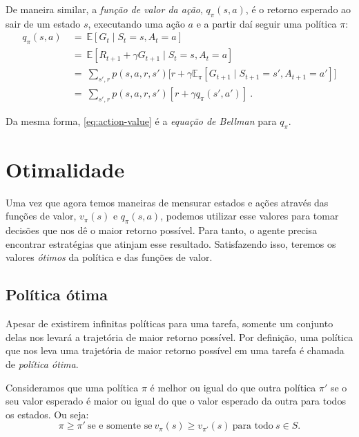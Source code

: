 \documentclass{article}
\begin{document}
            De maneira similar, a \emph{função de valor da ação}, $q_{\pi}(s, a)$, é o retorno esperado ao sair de um estado $s$, executando uma ação $a$ e a partir daí seguir uma política $\pi$:
            \begin{equation}
            \label{eq:action-value}
            \begin{split}
                q_{\pi}(s, a) & \ = \ \mathbb{E}[G_t \mid S_t = s, A_t = a] \\
                & \ = \ \mathbb{E}[R_{t+1} + \gamma G_{t+1} \mid S_t = s, A_t = a] \\
                & \ = \ \sum_{s',r} p(s, a, r, s') \Big[r + \gamma \mathbb{E}_{\pi}[ G_{t+1} \mid S_{t+1} = s', A_{t+1} = a'] \Big]\\
                & \ = \ \sum_{s',r} p(s, a, r, s') [r + \gamma q_{\pi}(s', a')]\ .
            \end{split}
            \end{equation}

            Da mesma forma, \eqref{eq:action-value} é a \emph{equação de Bellman} para $q_{\pi}$.
        
    \section{Otimalidade}
    
        Uma vez que agora temos maneiras de mensurar estados e ações através das funções de valor, $v_{\pi}(s)$ e $q_{\pi}(s, a)$, podemos utilizar esse valores para tomar decisões que nos dê o maior retorno possível. Para tanto, o agente precisa encontrar estratégias que atinjam esse resultado. Satisfazendo isso, teremos os valores \emph{ótimos} da política e das funções de valor.

        \subsection{Política ótima}
        
            Apesar de existirem infinitas políticas para uma tarefa, somente um conjunto delas nos levará a trajetória de maior retorno possível. Por definição, uma política que nos leva uma trajetória de maior retorno possível em uma tarefa é chamada de \emph{política ótima}.

            Consideramos que uma política $\pi$ é melhor ou igual do que outra política $\pi'$ se o seu valor esperado é maior ou igual do que o valor esperado da outra para todos os estados. Ou seja:
            \begin{equation*}
                \pi \geq \pi'\ \text{se e somente se}\ v_{\pi}(s) \geq v_{\pi'}(s)\ \text{para todo}\ s \in S.
            \end{equation*}
            
\end{document}
